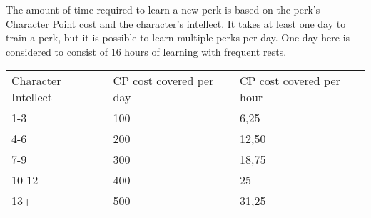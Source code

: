 The amount of time required to learn a new perk is based on the perk's Character Point cost and the character's intellect. It takes at least one day to train a perk, but it is possible to learn multiple perks per day. One day here is considered to consist of 16 hours of learning with frequent rests.\\

\begin{tabular}{l | l | l}
	Character Intellect & CP cost covered per day & CP cost covered per hour\\
	1-3 & 100 & 6,25\\
	4-6 & 200 & 12,50\\
	7-9 & 300 & 18,75\\
	10-12 & 400 & 25\\
	13+ & 500 & 31,25
\end{tabular}